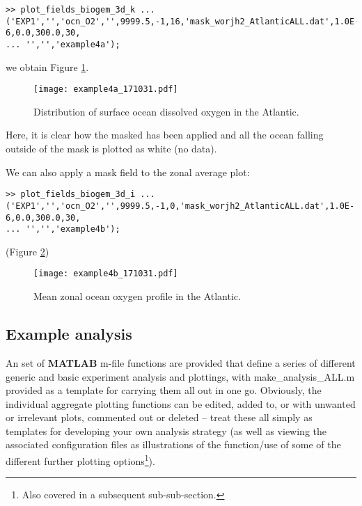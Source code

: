 \documentclass[11pt,fleqn]{book} %
\begin{document}
\begin{enumerate}[noitemsep]
\footnotesize
\vspace{-0pt}\begin{verbatim}
>> plot_fields_biogem_3d_k ...
('EXP1','','ocn_O2','',9999.5,-1,16,'mask_worjh2_AtlanticALL.dat',1.0E-6,0.0,300.0,30,
... '','','example4a');
\end{verbatim}\vspace{-0pt}
\normalsize
we obtain Figure \ref{fig:example4a}.

\begin{figure}[ht]
\begin{center}
\texttt{[image: example4a\_171031.pdf]}
\end{center}
\vspace{-4mm}
\caption{Distribution of surface ocean dissolved  oxygen in the Atlantic.}
\label{fig:example4a}
\end{figure}

Here, it is clear how the masked has been applied and all the ocean falling outside of the mask is plotted as white (no data).

We can also apply a mask field to the zonal average plot:

\footnotesize
\vspace{-0pt}\begin{verbatim}
>> plot_fields_biogem_3d_i ...
('EXP1','','ocn_O2','',9999.5,-1,0,'mask_worjh2_AtlanticALL.dat',1.0E-6,0.0,300.0,30,
... '','','example4b');
\end{verbatim}\vspace{-0pt}
\normalsize
(Figure \ref{fig:example4b})

\begin{figure}[ht]
\begin{center}
\texttt{[image: example4b\_171031.pdf]}
\end{center}
\vspace{-4mm}
\caption{Mean zonal ocean oxygen profile in the Atlantic.}
\label{fig:example4b}
\end{figure}

\end{enumerate}


\subsection{Example analysis}

An set of \textbf{MATLAB} \footnotesize\textsf{m-file }\normalsize functions are provided that define a series of different generic and basic experiment analysis and plottings, with \footnotesize\textsf{make\_analysis\_ALL.m }\normalsize provided as a template for carrying them all out in one go. Obviously, the individual aggregate plotting functions can be edited, added to, or with unwanted or irrelevant plots, commented out or deleted -- treat these all simply as templates for developing your own analysis strategy (as well as viewing the associated configuration files as illustrations of the function/use of some of the different further plotting options\footnote{Also covered in a subsequent sub-sub-section.}).
\end{document}

